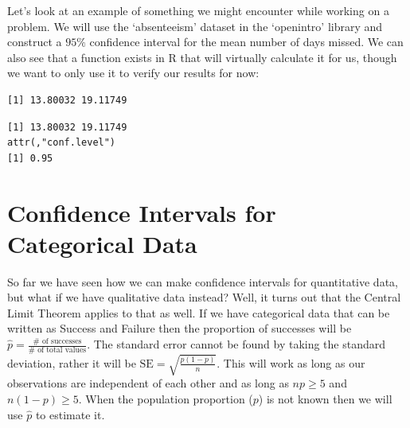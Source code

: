 \documentclass[
  letterpaper,
  DIV=11,
  numbers=noendperiod]{scrreprt}
\newenvironment{Shaded}{\begin{snugshade}}{\end{snugshade}}
\newcommand{\AttributeTok}[1]{\textcolor[rgb]{0.40,0.45,0.13}{#1}}
\newcommand{\CommentTok}[1]{\textcolor[rgb]{0.37,0.37,0.37}{#1}}
\newcommand{\DecValTok}[1]{\textcolor[rgb]{0.68,0.00,0.00}{#1}}
\newcommand{\FunctionTok}[1]{\textcolor[rgb]{0.28,0.35,0.67}{#1}}
\newcommand{\NormalTok}[1]{\textcolor[rgb]{0.00,0.23,0.31}{#1}}
\newcommand{\OtherTok}[1]{\textcolor[rgb]{0.00,0.23,0.31}{#1}}
\newcommand{\SpecialCharTok}[1]{\textcolor[rgb]{0.37,0.37,0.37}{#1}}
\begin{document}
Let's look at an example of something we might encounter while working
on a problem. We will use the `absenteeism' dataset in the `openintro'
library and construct a \(95\%\) confidence interval for the mean number
of days missed. We can also see that a function exists in R that will
virtually calculate it for us, though we want to only use it to verify
our results for now:

\begin{Shaded}
\end{Shaded}

\begin{verbatim}
[1] 13.80032 19.11749
\end{verbatim}

\begin{Shaded}
\end{Shaded}

\begin{verbatim}
[1] 13.80032 19.11749
attr(,"conf.level")
[1] 0.95
\end{verbatim}

\section{Confidence Intervals for Categorical
Data}\label{confidence-intervals-for-categorical-data}

So far we have seen how we can make confidence intervals for
quantitative data, but what if we have qualitative data instead? Well,
it turns out that the Central Limit Theorem applies to that as well. If
we have categorical data that can be written as Success and Failure then
the proportion of successes will be
\(\hat{p}=\frac{\# \text{ of successes}}{\# \text{ of total values}}\).
The standard error cannot be found by taking the standard deviation,
rather it will be \(\text{SE}=\sqrt{\frac{p(1-p)}{n}}\). This will work
as long as our observations are independent of each other and as long as
\(np\geq 5\) and \(n(1-p)\geq 5\). When the population proportion
(\(p\)) is not known then we will use \(\hat{p}\) to estimate it.
\end{document}
